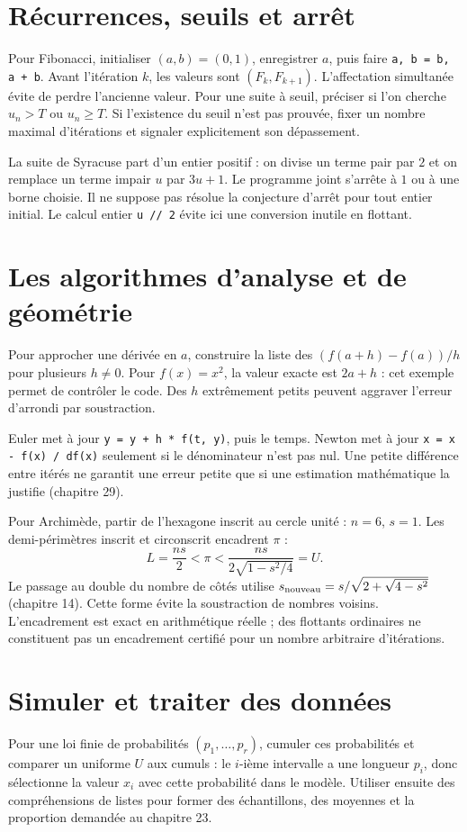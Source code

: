 \documentclass[../cours_1re.tex]{subfiles}
\begin{document}
\section{Récurrences, seuils et arrêt}
Pour Fibonacci, initialiser $(a,b)=(0,1)$, enregistrer $a$, puis faire
\texttt{a, b = b, a + b}. Avant l'itération $k$, les valeurs sont
$(F_k,F_{k+1})$. L'affectation simultanée évite de perdre l'ancienne valeur.
Pour une suite à seuil, préciser si l'on cherche $u_n>T$ ou $u_n\ge T$.
Si l'existence du seuil n'est pas prouvée, fixer un nombre maximal d'itérations
et signaler explicitement son dépassement.

La suite de Syracuse part d'un entier positif : on divise un terme pair
par $2$ et on remplace un terme impair $u$ par $3u+1$.
Le programme joint s'arrête à $1$ ou à une borne choisie.
Il ne suppose pas résolue la conjecture d'arrêt pour tout entier initial.
Le calcul entier \texttt{u // 2} évite ici une conversion inutile en flottant.

\section{Les algorithmes d'analyse et de géométrie}
Pour approcher une dérivée en $a$, construire la liste des
$(f(a+h)-f(a))/h$ pour plusieurs $h\ne0$. Pour $f(x)=x^2$,
la valeur exacte est $2a+h$ : cet exemple permet de contrôler le code.
Des $h$ extrêmement petits peuvent aggraver l'erreur d'arrondi par soustraction.

Euler met à jour \texttt{y = y + h * f(t, y)}, puis le temps.
Newton met à jour \texttt{x = x - f(x) / df(x)} seulement si le dénominateur
n'est pas nul. Une petite différence entre itérés ne garantit une erreur
petite que si une estimation mathématique la justifie (chapitre 29).

Pour Archimède, partir de l'hexagone inscrit au cercle unité : $n=6$, $s=1$.
Les demi-périmètres inscrit et circonscrit encadrent $\pi$ :
\[
L=\frac{ns}{2}<\pi<\frac{ns}{2\sqrt{1-s^2/4}}=U.
\]
Le passage au double du nombre de côtés utilise
$s_{\rm nouveau}=s/\sqrt{2+\sqrt{4-s^2}}$ (chapitre 14).
Cette forme évite la soustraction de nombres voisins.
L'encadrement est exact en arithmétique réelle ; des flottants ordinaires
ne constituent pas un encadrement certifié pour un nombre arbitraire d'itérations.

\section{Simuler et traiter des données}
Pour une loi finie de probabilités $(p_1,\ldots,p_r)$, cumuler ces probabilités
et comparer un uniforme $U$ aux cumuls : le $i$-ième intervalle a une longueur
$p_i$, donc sélectionne la valeur $x_i$ avec cette probabilité dans le modèle.
Utiliser ensuite des compréhensions de listes pour former des échantillons,
des moyennes et la proportion demandée au chapitre 23.
\end{document}
